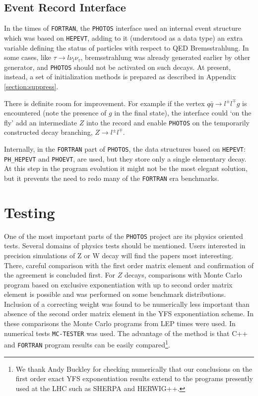 \documentclass[]{Photos_interface_design}
\begin{document}
 
\subsection{Event Record Interface}
In the times of {\tt FORTRAN}, the {\tt PHOTOS} interface used an internal event structure which was
based on {\tt HEPEVT},
adding to it (understood as a data type) an extra variable defining 
the status of particles with respect to QED Bremsstrahlung. In some cases, like
$\tau \to l \nu_l \nu_\tau$, bremsstrahlung was already generated earlier
by other generator, and {\tt PHOTOS} should not be activated on such decays.
At present, instead, a set of initialization methods is 
prepared as described in Appendix \ref{section:suppress}. 

There is definite room for 
improvement. For example if the vertex $q \bar q \to l^\pm l^\mp g$ is encountered
(note the presence of $g$ in the final state),
the interface could `on the fly' add an intermediate $Z$ into the record and enable {\tt PHOTOS}
on the temporarily constructed decay branching, $Z \to l^\pm l^\mp $. 

Internally, in the {\tt FORTRAN} part of {\tt PHOTOS}, the data
structures based on {\tt HEPEVT}: {\tt PH\_HEPEVT} and {\tt PHOEVT}, 
are used, but they store only a single elementary decay. 
At this step in the program
evolution it might not be the most elegant solution, but it prevents
the need to redo many of the {\tt FORTRAN} era benchmarks.






\section{Testing}
\label{sec:tests} 
One of the most important parts of the {\tt PHOTOS} project are its physics oriented tests.
Several domains
of physics tests should be mentioned. Users interested in precision 
simulations of Z or W decay  will 
find  the papers \cite{Nanava:2009vg,Golonka:2006tw,Golonka:2005pn}
most interesting. There, careful comparison with the first order matrix element 
and confirmation of the agreement is concluded first.
For $Z$ decays, comparisons  with Monte Carlo program based on exclusive 
exponentiation with up to second order matrix element
is possible and was performed on some benchmark distributions.
Inclusion of a correcting weight was found to be numerically less important
than absence of the second order matrix element in the YFS exponentiation scheme. 
In these comparisons the Monte Carlo programs from LEP times 
\cite{koralz4:1994,kkcpc:1999} were used. In numerical tests {\tt MC-TESTER} \cite{Davidson:2008ma}
was used. The advantage of the method is that C++ and {\tt FORTRAN} program
results can be easily compared\footnote{We thank Andy Buckley for checking numerically
 that our conclusions on the first order exact YFS exponentiation results extend
to the programs presently used at the LHC such as  
SHERPA and HERWIG++.  }.
 
\end{document}
